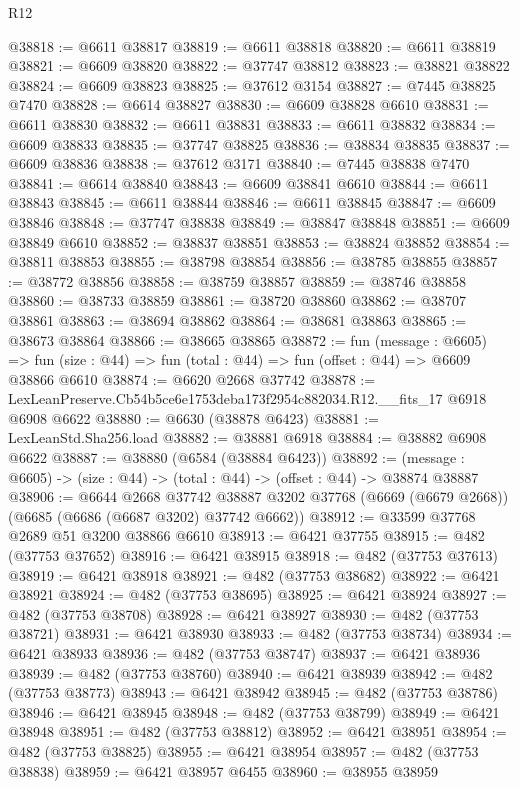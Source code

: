 \begin{lexlean}{R12}
\begin{coremodule}
@38818 := @6611 @38817
@38819 := @6611 @38818
@38820 := @6611 @38819
@38821 := @6609 @38820
@38822 := @37747 @38812
@38823 := @38821 @38822
@38824 := @6609 @38823
@38825 := @37612 @3154
@38827 := @7445 @38825 @7470
@38828 := @6614 @38827
@38830 := @6609 @38828 @6610
@38831 := @6611 @38830
@38832 := @6611 @38831
@38833 := @6611 @38832
@38834 := @6609 @38833
@38835 := @37747 @38825
@38836 := @38834 @38835
@38837 := @6609 @38836
@38838 := @37612 @3171
@38840 := @7445 @38838 @7470
@38841 := @6614 @38840
@38843 := @6609 @38841 @6610
@38844 := @6611 @38843
@38845 := @6611 @38844
@38846 := @6611 @38845
@38847 := @6609 @38846
@38848 := @37747 @38838
@38849 := @38847 @38848
@38851 := @6609 @38849 @6610
@38852 := @38837 @38851
@38853 := @38824 @38852
@38854 := @38811 @38853
@38855 := @38798 @38854
@38856 := @38785 @38855
@38857 := @38772 @38856
@38858 := @38759 @38857
@38859 := @38746 @38858
@38860 := @38733 @38859
@38861 := @38720 @38860
@38862 := @38707 @38861
@38863 := @38694 @38862
@38864 := @38681 @38863
@38865 := @38673 @38864
@38866 := @38665 @38865
@38872 := fun (message : @6605) =>
  fun (size : @44) => fun (total : @44) => fun (offset : @44) => @6609 @38866 @6610
@38874 := @6620 @2668 @37742
@38878 := LexLeanPreserve.Cb54b5ce6e1753deba173f2954c882034.R12.__fits_17 @6918 @6908 @6622
@38880 := @6630 (@38878 @6423)
@38881 := LexLeanStd.Sha256.load
@38882 := @38881 @6918
@38884 := @38882 @6908 @6622
@38887 := @38880 (@6584 (@38884 @6423))
@38892 := (message : @6605) -> (size : @44) -> (total : @44) -> (offset : @44) -> @38874 @38887
@38906 := @6644
    @2668
    @37742
    @38887
    @3202
    @37768
    (@6669 (@6679 @2668))
    (@6685 (@6686 (@6687 @3202) @37742 @6662))
@38912 := @33599 @37768 @2689 @51 @3200 @38866 @6610
@38913 := @6421 @37755
@38915 := @482 (@37753 @37652)
@38916 := @6421 @38915
@38918 := @482 (@37753 @37613)
@38919 := @6421 @38918
@38921 := @482 (@37753 @38682)
@38922 := @6421 @38921
@38924 := @482 (@37753 @38695)
@38925 := @6421 @38924
@38927 := @482 (@37753 @38708)
@38928 := @6421 @38927
@38930 := @482 (@37753 @38721)
@38931 := @6421 @38930
@38933 := @482 (@37753 @38734)
@38934 := @6421 @38933
@38936 := @482 (@37753 @38747)
@38937 := @6421 @38936
@38939 := @482 (@37753 @38760)
@38940 := @6421 @38939
@38942 := @482 (@37753 @38773)
@38943 := @6421 @38942
@38945 := @482 (@37753 @38786)
@38946 := @6421 @38945
@38948 := @482 (@37753 @38799)
@38949 := @6421 @38948
@38951 := @482 (@37753 @38812)
@38952 := @6421 @38951
@38954 := @482 (@37753 @38825)
@38955 := @6421 @38954
@38957 := @482 (@37753 @38838)
@38959 := @6421 @38957 @6455
@38960 := @38955 @38959

\end{coremodule}
\end{lexlean}
